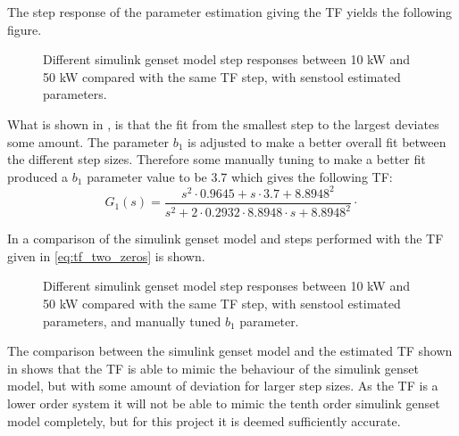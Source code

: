 The step response of the parameter estimation giving the TF yields the following figure.

\begin{figure}[H]
\centering

\caption{Different simulink genset model step responses between 10 kW and 50 kW compared with the same TF step, with senstool estimated parameters.}
\label{fig:steps_model_comparison_firsttry}
\end{figure}

What is shown in , is that the fit from the smallest step to the largest deviates some amount. 
The parameter $b_1$ is adjusted to make a better overall fit between the different step sizes. Therefore some manually tuning to make a better fit produced a $b_1$ parameter value to be 3.7 which gives the following TF:
%
\begin{equation}
\label{eq:tf_two_zeros}
G_1(s) = \frac {s^2 \cdot 0.9645+s \cdot 3.7+8.8948^2}{s^2+2\cdot 0.2932 \cdot 8.8948 \cdot s + 8.8948^2} \unit{\cdot}
\end{equation}  

In  a comparison of the simulink genset model and steps performed with the TF given in \eqref{eq:tf_two_zeros} is shown.


\begin{figure}[H]
\centering

\caption{Different simulink genset model step responses between 10 kW and 50 kW compared with the same TF step, with senstool estimated parameters, and manually tuned $b_1$ parameter.}
\label{fig:steps_model_comparison}
\end{figure}

The comparison between the simulink genset model and the estimated TF shown in  shows that the TF is able to mimic the behaviour of the simulink genset model, but with some amount of deviation for larger step sizes. As the TF is a lower order system it will not be able to mimic the tenth order simulink genset model completely, but for this project it is deemed sufficiently accurate.

